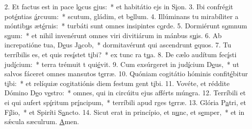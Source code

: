 2. Et factus est in pace l\uline{o}cus \uline{e}jus:~* et habitátio ejs in S\uline{i}on.
3. Ibi confrégit pot\uline{é}ntias \uline{á}rcuum:~* scutum, gládim, et b\uline{e}llum.
4. Illúminans tu mirabíliter a móntib\uline{u}s æt\uline{é}rnis:~* turbáti sunt omnes insipintes c\uline{o}rde.
5. Dormiérunt s\uline{o}mnum s\uline{u}um:~* et nihil invenérunt omnes viri divitiárum in mánbus s\uline{u}is.
6. Ab increpatióne tua, D\uline{e}us J\uline{a}cob,~* dormitavérunt qui ascendrunt \uline{e}quos.
7. Tu terríbilis es, et quis res\uline{í}stet t\uline{i}bi?~* ex tunc ra t\uline{u}a.
8. De cælo audítum fec\uline{í}sti jud\uline{í}cium:~* terra trémuit t qui\uline{é}vit.
9. Cum exsúrgeret in jud\uline{í}cium D\uline{e}us,~* ut salvos fáceret omnes mansutos t\uline{e}rræ.
10. Quóniam cogitátio hóminis confit\uline{é}bitur t\uline{i}bi:~* et relíquiæ cogitatiónis diem festum gent t\uline{i}bi.
11. Vovéte, et réddite Dómino D\uline{e}o v\uline{e}stro:~* omnes, qui in circúitu ejus afférts mún\uline{e}ra.
12. Terríbili et ei qui aufert sp\uline{í}ritum pr\uline{í}ncipum,~* terríbili apud rges t\uline{e}rræ.
13. Glória P\uline{a}tri, et F\uline{í}lio,~* et Spiríti S\uline{a}ncto.
14. Sicut erat in princípio, et n\uline{u}nc, et s\uline{e}mper,~* et in sǽcula sæculrum. \uline{A}men.
